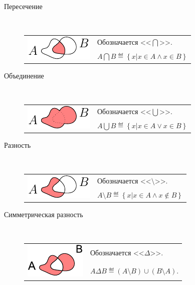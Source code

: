 \begin{description}
	\item[Пересечение]\par\strut\\
		\begin{tabular}{ll}
			\multirow{2}{*}{\includegraphics{graph/set-op-intersection}}
				& Обозначается <<$\bigcap$>>. \\
				& $A\bigcap B\eqdef\left\{x\vert x\in A \land x\in B\right\}$
		\end{tabular}
	\item[Объединение]\par\strut\\
		\begin{tabular}{ll}
			\multirow{2}{*}{\includegraphics{graph/set-op-union}}
				& Обозначается <<$\bigcup$>>. \\
				& $A\bigcup B\eqdef\left\{x\vert x\in A \lor  x\in B\right\}$
		\end{tabular}
	\item[Разность]\par\strut\\
		\begin{tabular}{ll}
			\multirow{2}{*}{\includegraphics{graph/set-op-difference}}
				& Обозначается <<$\setminus$>>. \\
				& $A\setminus B\eqdef\left\{x\vert x\in A \land x\notin B\right\}$
		\end{tabular}
	\item[Симметрическая разность]\par\strut\\
		\begin{tabular}{ll}			
			\multirow{2}{*}{\includegraphics{graph/set-op-simmdifference}}
				& Обозначается <<$\Delta$>>. \\
				& $A\Delta B\eqdef(A\setminus B)\cup(B\setminus A)$.
		\end{tabular}
\end{description}

